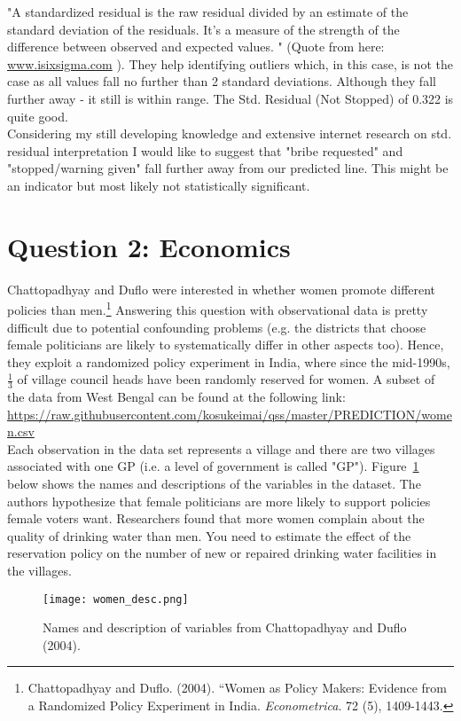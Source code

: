 \documentclass[12pt,letterpaper]{article}
\begin{document}
"A standardized residual is the raw residual divided by an estimate of the standard deviation of the residuals. It’s a measure of the strength of the difference between observed and expected values. " (Quote from here: \href{https://www.isixsigma.com/dictionary/standardized-residual/#:~:text=A%20standardized%20residual%20is%20the,between%20observed%20and%20expected%20values.}{www.isixsigma.com} ). They help identifying outliers which, in this case, is not the case as all values fall no further than 2 standard deviations. Although they fall further away - it still is within range. The Std. Residual (Not Stopped) of 0.322 is quite good. \\

Considering my still developing knowledge and extensive internet research on std. residual interpretation I would like to suggest that "bribe requested" and "stopped/warning given" fall further away from our predicted line. This might be an indicator but most likely not statistically significant.

\newpage

\section*{Question 2: Economics}
Chattopadhyay and Duflo were interested in whether women promote different policies than men.\footnote{Chattopadhyay and Duflo. (2004). ``Women as Policy Makers: Evidence from a Randomized Policy Experiment in India. \textit{Econometrica}. 72 (5), 1409-1443.} Answering this question with observational data is pretty difficult due to potential confounding problems (e.g. the districts that choose female politicians are likely to systematically differ in other aspects too). Hence, they exploit a randomized policy experiment in India, where since the mid-1990s, $\frac{1}{3}$ of village council heads have been randomly reserved for women. A subset of the data from West Bengal can be found at the following link: \url{https://raw.githubusercontent.com/kosukeimai/qss/master/PREDICTION/women.csv}\\

\noindent Each observation in the data set represents a village and there are two villages associated with one GP (i.e. a level of government is called "GP"). Figure~\ref{fig:women_desc} below shows the names and descriptions of the variables in the dataset. The authors hypothesize that female politicians are more likely to support policies female voters want. Researchers found that more women complain about the quality of drinking water than men. You need to estimate the effect of the reservation policy on the number of new or repaired drinking water facilities in the villages.
\vspace{.5cm}
\begin{figure}[h!]
	\caption{\footnotesize{Names and description of variables from Chattopadhyay and Duflo (2004).}}
	\vspace{.2cm}
	\centering
	\label{fig:women_desc}
	\texttt{[image: women\_desc.png]}
\end{figure}		
\end{document}
